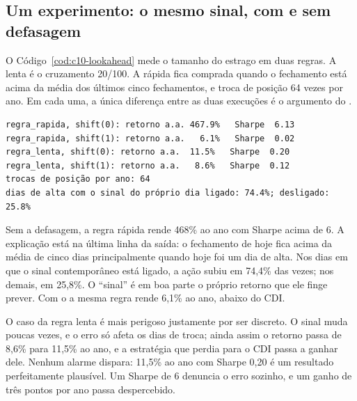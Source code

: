 \subsection{Um experimento: o mesmo sinal, com e sem defasagem}

O Código~\ref{cod:c10-lookahead} mede o tamanho do estrago em duas regras. A lenta é o cruzamento 20/100. A rápida fica comprada quando o fechamento está acima da média dos últimos cinco fechamentos, e troca de posição 64 vezes por ano. Em cada uma, a única diferença entre as duas execuções é o argumento do .


\begin{lstlisting}[style=saida]
regra_rapida, shift(0): retorno a.a. 467.9%   Sharpe  6.13
regra_rapida, shift(1): retorno a.a.   6.1%   Sharpe  0.02
regra_lenta, shift(0): retorno a.a.  11.5%   Sharpe  0.20
regra_lenta, shift(1): retorno a.a.   8.6%   Sharpe  0.12
trocas de posição por ano: 64
dias de alta com o sinal do próprio dia ligado: 74.4%; desligado: 25.8%
\end{lstlisting}


Sem a defasagem, a regra rápida rende 468\% ao ano com Sharpe acima de 6. A explicação está na última linha da saída: o fechamento de hoje fica acima da média de cinco dias principalmente quando hoje foi um dia de alta. Nos dias em que o sinal contemporâneo está ligado, a ação subiu em 74,4\% das vezes; nos demais, em 25,8\%. O ``sinal'' é em boa parte o próprio retorno que ele finge prever. Com o  a mesma regra rende 6,1\% ao ano, abaixo do CDI.

O caso da regra lenta é mais perigoso justamente por ser discreto. O sinal muda poucas vezes, e o erro só afeta os dias de troca; ainda assim o retorno passa de 8,6\% para 11,5\% ao ano, e a estratégia que perdia para o CDI passa a ganhar dele. Nenhum alarme dispara: 11,5\% ao ano com Sharpe 0,20 é um resultado perfeitamente plausível. Um Sharpe de 6 denuncia o erro sozinho, e um ganho de três pontos por ano passa despercebido.

